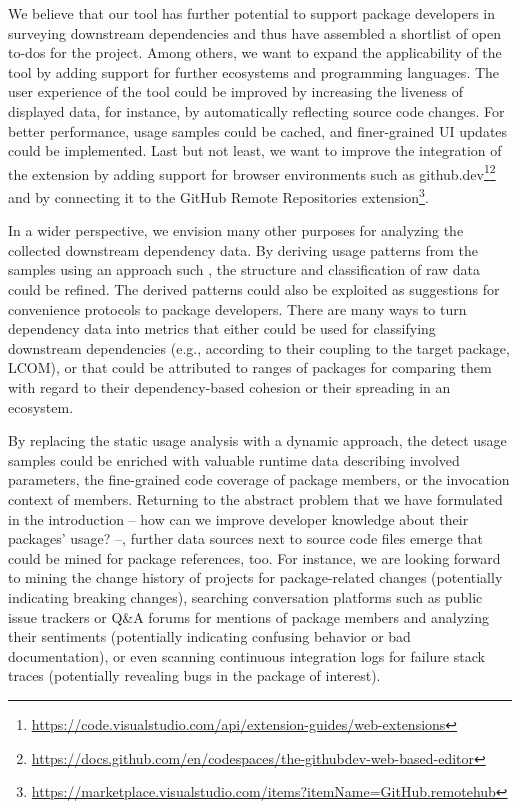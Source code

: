 We believe that our tool has further potential to support package developers in surveying downstream dependencies and thus have assembled a shortlist of open to-dos for the project.
Among others, we want to expand the applicability of the tool by adding support for further ecosystems and programming languages.
The user experience of the tool could be improved by increasing the liveness of displayed data, for instance, by automatically reflecting source code changes.
For better performance, usage samples could be cached, and finer-grained UI updates could be implemented.
Last but not least, we want to improve the integration of the extension by adding support for browser environments such as github.dev\footnote{\url{https://code.visualstudio.com/api/extension-guides/web-extensions}}\footnoteseparator\footnote{\url{https://docs.github.com/en/codespaces/the-githubdev-web-based-editor}} and by connecting it to the GitHub Remote Repositories extension\footnote{\url{https://marketplace.visualstudio.com/items?itemName=GitHub.remotehub}}.

In a wider perspective, we envision many other purposes for analyzing the collected downstream dependency data.
By deriving usage patterns from the samples using an approach such \cite{zhong2009mapo}, the structure and classification of raw data could be refined.
The derived patterns could also be exploited as suggestions for convenience protocols to package developers.
There are many ways to turn dependency data into metrics that either could be used for classifying downstream dependencies (e.g., according to their coupling to the target package, LCOM), or that could be attributed to ranges of packages for comparing them with regard to their dependency-based cohesion or their spreading in an ecosystem.

By replacing the static usage analysis with a dynamic approach, the detect usage samples could be enriched with valuable runtime data describing involved parameters, the fine-grained code coverage of package members, or the invocation context of members.
Returning to the abstract problem that we have formulated in the introduction -- how can we improve developer knowledge about their packages' usage? --, further data sources next to source code files emerge that could be mined for package references, too.
For instance, we are looking forward to mining the change history of projects for package-related changes (potentially indicating breaking changes), searching conversation platforms such as public issue trackers or Q\&A forums for mentions of package members and analyzing their sentiments (potentially indicating confusing behavior or bad documentation), or even scanning continuous integration logs for failure stack traces (potentially revealing bugs in the package of interest).
